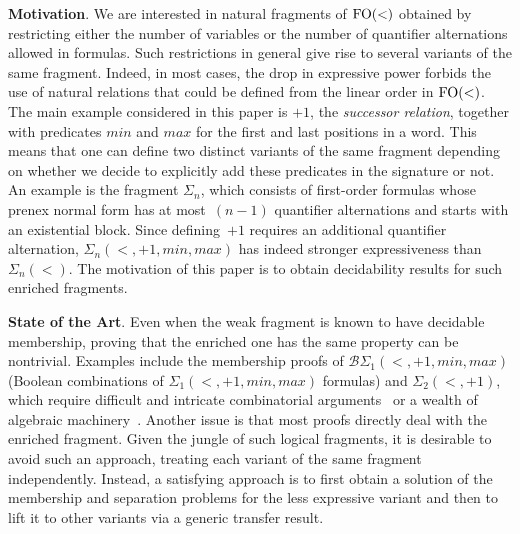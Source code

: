 \documentclass[a4paper,USenglish]{lipics}
\newcommand{\plus}{\ensuremath{+1,min,max}}
\newcommand{\sic}[1]{\ensuremath{\Sigma_{#1}}\xspace}
\newcommand{\sio}[1]{\ensuremath{\Sigma_{#1}(<)}\xspace}
\newcommand{\sip}[1]{\ensuremath{\Sigma_{#1}(<,\plus)}\xspace}
\newcommand{\bsp}[1]{\ensuremath{\mathcal{B}\Sigma_{#1}(<,\plus)}\xspace}
\newcommand{\sdp}{\ensuremath{\Sigma_{2}(<,+1)}\xspace}
\newcommand{\fow}{\ensuremath{\textup{FO}(<)}\xspace}
\newcommand\highlight[1]{\par\bigskip\noindent\textbf{\sffamily #1}.}
\theoremstyle{plain}
\begin{document}
\highlight{Motivation}  We are interested in natural fragments
of \fow obtained by restricting either the number of variables or the number
of quantifier alternations allowed in formulas. Such restrictions in general
give rise to several variants of the same fragment. Indeed, in most cases, the
drop in expressive power forbids the use of natural relations that could be
defined from the linear order in \fow. The main example considered in this
paper is $+1$, the \emph{successor relation}, together with predicates $min$
and $max$ for the first and last positions in a word. This means that one can
define two distinct variants of the same fragment depending on whether we
decide to explicitly add these predicates in the signature or
not. An example is the fragment $\sic n$, which consists of first-order formulas
whose prenex normal form has at most~$(n-1)$ quantifier alternations and starts with an
existential block. Since defining~$+1$ requires an additional
quantifier alternation, $\sip n$ has indeed stronger expressiveness than $\sio n$.
The motivation of this paper is to obtain decidability results for such
enriched fragments.

\highlight{State of the Art} Even when the weak fragment is
known to have decidable membership, proving that the enriched one has
the same property can be nontrivial. Examples include the membership
proofs of $\bsp1$ (Boolean combinations of $\sip1$ formulas) and
$\sdp$, which require difficult and intricate combinatorial
arguments~\cite{Knast:dd1:1983a,glasser-dd3/2,DBLP:journals/ijfcs/KufleitnerL12}
or a wealth of algebraic machinery~\cite{pwdelta,pw:wreath}. Another issue is that most proofs
directly deal with the enriched fragment. Given the jungle of such logical
fragments, it is desirable to avoid such an approach, treating each variant of
the same fragment independently. Instead, a satisfying approach is to first
obtain a solution of the membership and separation problems for the less
expressive variant and then to lift it to other variants via a generic
transfer result.
\end{document}
